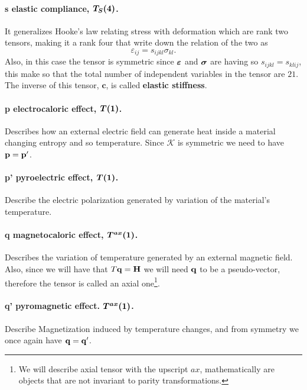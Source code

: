 \paragraph{s elastic compliance, $\vb*{T_S(4)}$.} It generalizes Hooke's law relating stress with deformation which are rank two tensors, making it a rank four that write down the relation of the two as
\begin{equation}
    \varepsilon_{ij} = s_{ijkl} \sigma_{kl}.
\end{equation}
Also, in this case the tensor is symmetric since $\vb*{\varepsilon}$ and $\vb*{\sigma}$ are having so $s_{ijkl} = s_{klij}$, this make so that the total number of independent variables in the tensor are $21$. The inverse of this tensor, $\mathbf{c}$, is called \textbf{elastic stiffness}.

\paragraph{p electrocaloric effect, $\vb*{T(1)}$.} Describes how an external electric field can generate heat inside a material changing entropy and so temperature. Since $\mathcal{K}$ is symmetric we need to have $\vb{p} = \vb{p}'$.

\paragraph{p' pyroelectric effect, $\vb*{T(1)}$.} Describe the electric polarization generated by variation of the material's temperature.

\paragraph{q magnetocaloric effect, $\vb*{T^{ax}(1)}$.} Describes the variation of temperature generated by an external magnetic field. Also, since we will have that $T\vb{q} = \vb{H}$ we will need $\vb{q}$ to be a pseudo-vector, therefore the tensor is called an axial one\footnote{We will describe axial tensor with the upscript $ax$, mathematically are objects that are not invariant to parity transformations.}.

\paragraph{q' pyromagnetic effect. $\vb*{T^{ax}(1)}$.} Describe Magnetization induced by temperature changes, and from symmetry we once again have $\vb{q} = \vb{q}'$.

